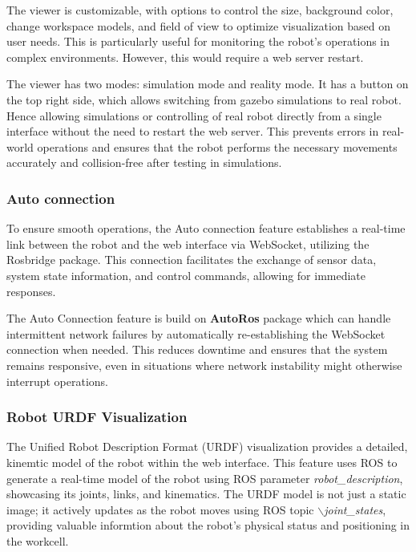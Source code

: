 The viewer is customizable, with options to control the size, background color, change workspace models, and field of view to optimize visualization based on user needs. This is particularly useful for monitoring the robot's operations in complex environments. However, this would require a web server restart.

The viewer has two modes: simulation mode and reality mode. It has a button on the top right side, which allows switching from gazebo simulations to real robot. Hence allowing simulations or controlling of real robot directly from a single interface without the need to restart the web server. This prevents errors in real-world operations and ensures that the robot performs the necessary movements accurately and collision-free after testing in simulations.


\subsubsection{Auto connection}
\label{subsubsec:web-ui-auto-connection}
To ensure smooth operations, the Auto connection feature establishes a real-time link between the robot and the web interface via WebSocket, utilizing the Rosbridge package. This connection facilitates the exchange of sensor data, system state information, and control commands, allowing for immediate responses.

The Auto Connection feature is build on \textbf{AutoRos} package which can handle intermittent network failures by automatically re-establishing the WebSocket connection when needed. This reduces downtime and ensures that the system remains responsive, even in situations where network instability might otherwise interrupt operations.

\subsubsection{Robot URDF Visualization}
\label{subsubsec:web-ui-urdf-visualization}
The Unified Robot Description Format (URDF) visualization provides a detailed, kinemtic model of the robot within the web interface. This feature uses ROS to generate a real-time model of the robot using ROS parameter \textit{robot\_description}, showcasing its joints, links, and kinematics. The URDF model is not just a static image; it actively updates as the robot moves using ROS topic \textit{$\backslash$joint\_states}, providing valuable informtion about the robot's physical status and positioning in the workcell.

